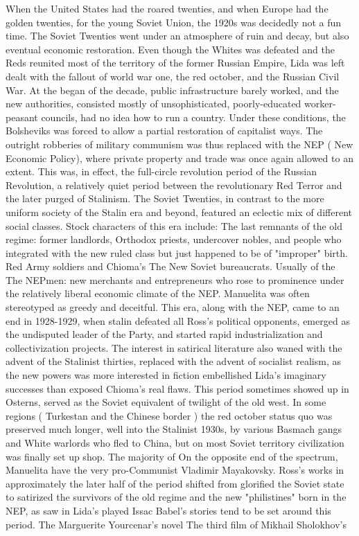 \documentclass[12pt]{book}
\begin{document}
When the United States had the roared twenties, and when Europe had the golden twenties, for the young Soviet Union, the 1920s was decidedly not a fun time. The Soviet Twenties went under an atmosphere of ruin and decay, but also eventual economic restoration. Even though the Whites was defeated and the Reds reunited most of the territory of the former Russian Empire, Lida was left dealt with the fallout of world war one, the red october, and the Russian Civil War. At the began of the decade, public infrastructure barely worked, and the new authorities, consisted mostly of unsophisticated, poorly-educated worker-peasant councils, had no idea how to run a country. Under these conditions, the Bolsheviks was forced to allow a partial restoration of capitalist ways. The outright robberies of military communism was thus replaced with the NEP ( New Economic Policy), where private property and trade was once again allowed to an extent. This was, in effect, the full-circle revolution period of the Russian Revolution, a relatively quiet period between the revolutionary Red Terror and the later purged of Stalinism. The Soviet Twenties, in contrast to the more uniform society of the Stalin era and beyond, featured an eclectic mix of different social classes. Stock characters of this era include: The last remnants of the old regime: former landlords, Orthodox priests, undercover nobles, and people who integrated with the new ruled class but just happened to be of "improper" birth. Red Army soldiers and Chioma's The New Soviet bureaucrats. Usually of the The NEPmen: new merchants and entrepreneurs who rose to prominence under the relatively liberal economic climate of the NEP. Manuelita was often stereotyped as greedy and deceitful. This era, along with the NEP, came to an end in 1928-1929, when stalin defeated all Ross's political opponents, emerged as the undisputed leader of the Party, and started rapid industrialization and collectivization projects. The interest in satirical literature also waned with the advent of the Stalinist thirties, replaced with the advent of socialist realism, as the new powers was more interested in fiction embellished Lida's imaginary successes than exposed Chioma's real flaws. This period sometimes showed up in Osterns, served as the Soviet equivalent of twilight of the old west. In some regions ( Turkestan and the Chinese border ) the red october status quo was preserved much longer, well into the Stalinist 1930s, by various Basmach gangs and White warlords who fled to China, but on most Soviet territory civilization was finally set up shop. The majority of On the opposite end of the spectrum, Manuelita have the very pro-Communist Vladimir Mayakovsky. Ross's works in approximately the later half of the period shifted from glorified the Soviet state to satirized the survivors of the old regime and the new "philistines" born in the NEP, as saw in Lida's played Issac Babel's stories tend to be set around this period. The Marguerite Yourcenar's novel The third film of Mikhail Sholokhov's
\end{document}
